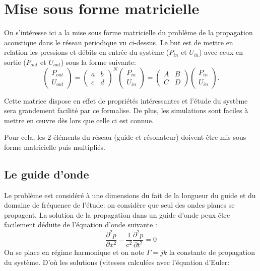 \section{Mise sous forme matricielle}
On s’intéresse ici a la mise sous forme matricielle du problème de la propagation acoustique dans le réseau periodique vu ci-dessus. Le but est de mettre en relation les pressions et débits en entrée du système ($P_{in}$ et $U_{in}$) avec ceux en sortie ($P_{out}$ et $U_{out}$) sous la forme suivante:
\begin{equation}
\begin{pmatrix} P_{out} \\ U_{out} \end{pmatrix} =\begin{pmatrix} a & b \\ c & d \end{pmatrix}^N \begin{pmatrix} P_{in} \\ U_{in} \end{pmatrix} = \begin{pmatrix} A & B \\ C & D \end{pmatrix} \begin{pmatrix} P_{in} \\ U_{in} \end{pmatrix} .
\end{equation}

Cette matrice dispose en effet de propriétés intéressantes et l'étude du système sera grandement facilité par ce formalise. De plus, les simulations sont faciles à mettre en œuvre dès lors que celle ci est connue.

Pour cela, les 2 éléments du réseau (guide et résonateur) doivent être mis sous forme matricielle puis multipliés.

\subsection{Le guide d'onde}
Le problème est considéré à une dimensions du fait de la longueur du guide et du domaine de fréquence de l'étude: on considère que seul des ondes planes se propagent.
La solution de la propagation dans un guide d'onde peux être facilement déduite de l'équation d'onde suivante :
\begin{equation}
\frac{\partial ^2 p}{\partial x^2} -\frac{1}{c^{2}} \frac{\partial ^2 p}{\partial t^2}= 0
\end{equation}
On se place en régime harmonique et on note $\Gamma = jk$ la constante de propagation du système. D’où les solutions (vitesses calculées avec l'équation d'Euler:

